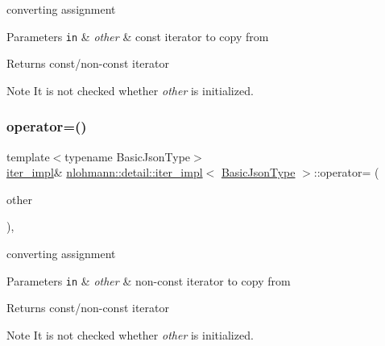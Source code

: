 converting assignment 


\begin{DoxyParams}[1]{Parameters}
\mbox{\tt in}  & {\em other} & const iterator to copy from \\
\hline
\end{DoxyParams}
\begin{DoxyReturn}{Returns}
const/non-\/const iterator 
\end{DoxyReturn}
\begin{DoxyNote}{Note}
It is not checked whether {\itshape other} is initialized. 
\end{DoxyNote}
\mbox{\label{classnlohmann_1_1detail_1_1iter__impl_a7159ed1cfe7c423a2baef8bea0c94509}} 
\subsubsection{\texorpdfstring{operator=()}{operator=()}\hspace{0.1cm}{\footnotesize\ttfamily [2/2]}}
{\footnotesize\ttfamily template$<$typename Basic\+Json\+Type$>$ \\
\hyperlink{classnlohmann_1_1detail_1_1iter__impl}{iter\+\_\+impl}\& \hyperlink{classnlohmann_1_1detail_1_1iter__impl}{nlohmann\+::detail\+::iter\+\_\+impl}$<$ \hyperlink{classnlohmann_1_1detail_1_1iter__impl_abf18f18793f84b0222aebb5a2a87da7a}{Basic\+Json\+Type} $>$\+::operator= (\begin{DoxyParamCaption}\item[{const \hyperlink{classnlohmann_1_1detail_1_1iter__impl}{iter\+\_\+impl}$<$ typename std\+::remove\+\_\+const$<$ \hyperlink{classnlohmann_1_1detail_1_1iter__impl_abf18f18793f84b0222aebb5a2a87da7a}{Basic\+Json\+Type} $>$\+::type $>$ \&}]{other }\end{DoxyParamCaption})\hspace{0.3cm}{\ttfamily [inline]}, {\ttfamily [noexcept]}}



converting assignment 


\begin{DoxyParams}[1]{Parameters}
\mbox{\tt in}  & {\em other} & non-\/const iterator to copy from \\
\hline
\end{DoxyParams}
\begin{DoxyReturn}{Returns}
const/non-\/const iterator 
\end{DoxyReturn}
\begin{DoxyNote}{Note}
It is not checked whether {\itshape other} is initialized. 
\end{DoxyNote}
\mbox{\label{classnlohmann_1_1detail_1_1iter__impl_a2b592605b63ae7f5401996ffa3b14393}} 
